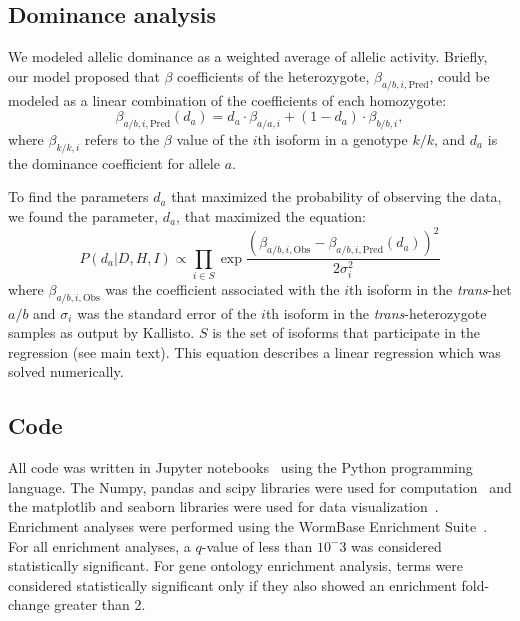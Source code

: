 \documentclass[10pt, twocolumn]{article}
\begin{document}
\subsection*{Dominance analysis}
\label{subsec:dominance}
We modeled allelic dominance as a weighted average of allelic activity. Briefly,
our model proposed that $\beta$ coefficients of the heterozygote,
$\beta_{a/b,i,\text{Pred}}$, could be modeled as a linear combination of the
coefficients of each homozygote:
\begin{equation}
  \beta_{a/b,i,\text{Pred}}(d_a) = d_a\cdot \beta_{a/a,i} + (1-d_a)\cdot \beta_{b/b,i},
\end{equation}
where $\beta_{k/k, i}$ refers to the $\beta$ value of the $i$th isoform in a
genotype $k/k$, and $d_a$ is the dominance coefficient for allele $a$.

To find the parameters $d_a$ that maximized the probability of observing the
data, we found the parameter, $d_a$, that maximized the equation:
\begin{equation}
    P(d_a|D,H,I) \propto \prod_{i \in S}
                   \exp{\frac{{(\beta_{a/b,i,\text{Obs}} -
                                \beta_{a/b,i,\text{Pred}}(d_a))}^2}{
                                2\sigma_i^2}}
\end{equation}
where $\beta_{a/b,i,\text{Obs}}$ was the coefficient associated with the $i$th
isoform in the \emph{trans}-het $a/b$ and $\sigma_i$ was the standard error of the
$i$th isoform in the \emph{trans}-heterozygote samples as output by Kallisto. $S$ is
the set of isoforms that participate in the regression (see main text). This
equation describes a linear regression which was solved numerically.

\subsection*{Code}
All code was written in Jupyter notebooks~\cite{Perez2007} using the Python
programming language. The Numpy, pandas and scipy libraries were used for
computation~\cite{VanDerWalt2011,McKinney2011,Oliphant2007} and the matplotlib
and seaborn libraries were used for data visualization~\cite{Hunter2007,Waskom}.
Enrichment analyses were performed using the WormBase Enrichment
Suite~\cite{Angeles-Albores2016}. For all enrichment analyses, a $q$-value of
less than $10^-3$ was considered statistically significant. For gene ontology
enrichment analysis, terms were considered statistically significant only if they
also showed an enrichment fold-change greater than 2.
\end{document}
